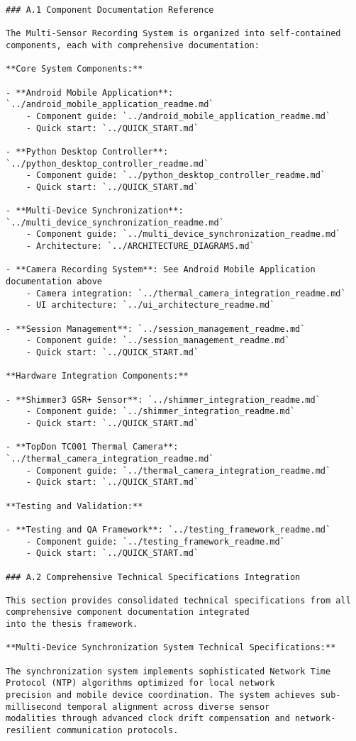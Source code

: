 \documentclass[12pt,a4paper]{report}
\begin{document}
\begin{verbatim}
### A.1 Component Documentation Reference

The Multi-Sensor Recording System is organized into self-contained components, each with comprehensive documentation:

**Core System Components:**

- **Android Mobile Application**: `../android_mobile_application_readme.md`
    - Component guide: `../android_mobile_application_readme.md`
    - Quick start: `../QUICK_START.md`

- **Python Desktop Controller**: `../python_desktop_controller_readme.md`
    - Component guide: `../python_desktop_controller_readme.md`
    - Quick start: `../QUICK_START.md`

- **Multi-Device Synchronization**: `../multi_device_synchronization_readme.md`
    - Component guide: `../multi_device_synchronization_readme.md`
    - Architecture: `../ARCHITECTURE_DIAGRAMS.md`

- **Camera Recording System**: See Android Mobile Application documentation above
    - Camera integration: `../thermal_camera_integration_readme.md`
    - UI architecture: `../ui_architecture_readme.md`

- **Session Management**: `../session_management_readme.md`
    - Component guide: `../session_management_readme.md`
    - Quick start: `../QUICK_START.md`

**Hardware Integration Components:**

- **Shimmer3 GSR+ Sensor**: `../shimmer_integration_readme.md`
    - Component guide: `../shimmer_integration_readme.md`
    - Quick start: `../QUICK_START.md`

- **TopDon TC001 Thermal Camera**: `../thermal_camera_integration_readme.md`
    - Component guide: `../thermal_camera_integration_readme.md`
    - Quick start: `../QUICK_START.md`

**Testing and Validation:**

- **Testing and QA Framework**: `../testing_framework_readme.md`
    - Component guide: `../testing_framework_readme.md`
    - Quick start: `../QUICK_START.md`

### A.2 Comprehensive Technical Specifications Integration

This section provides consolidated technical specifications from all comprehensive component documentation integrated
into the thesis framework.

**Multi-Device Synchronization System Technical Specifications:**

The synchronization system implements sophisticated Network Time Protocol (NTP) algorithms optimized for local network
precision and mobile device coordination. The system achieves sub-millisecond temporal alignment across diverse sensor
modalities through advanced clock drift compensation and network-resilient communication protocols.


\end{verbatim}
\end{document}
